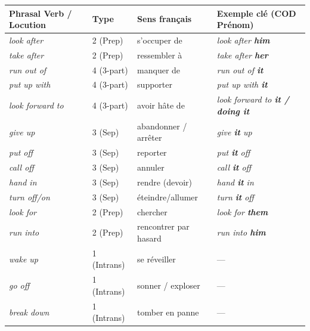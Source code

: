 \documentclass[11pt]{article}
\newcommand{\eng}[1]{\ifmmode\text{\textit{#1}}\else\begingroup\selectlanguage{english}\itshape #1\endgroup\fi}
\begin{document}
\begin{center}
\begin{tabularx}{\linewidth}{|X|X|X|X|}
\hline
\rowcolor{popblueL} \textbf{Phrasal Verb / Locution} & \textbf{Type} & \textbf{Sens français} & \textbf{Exemple clé (COD Prénom)} \\
\hline
\eng{look after} & 2 (Prep) & s'occuper de & \eng{look after \textbf{him}} \\
\eng{take after} & 2 (Prep) & ressembler à & \eng{take after \textbf{her}} \\
\eng{run out of} & 4 (3-part) & manquer de & \eng{run out of \textbf{it}} \\
\eng{put up with} & 4 (3-part) & supporter & \eng{put up with \textbf{it}} \\
\eng{look forward to} & 4 (3-part) & avoir hâte de & \eng{look forward to \textbf{it / doing it}} \\
\eng{give up} & 3 (Sep) & abandonner / arrêter & \eng{give \textbf{it} up} \\
\eng{put off} & 3 (Sep) & reporter & \eng{put \textbf{it} off} \\
\eng{call off} & 3 (Sep) & annuler & \eng{call \textbf{it} off} \\
\eng{hand in} & 3 (Sep) & rendre (devoir) & \eng{hand \textbf{it} in} \\
\eng{turn off/on} & 3 (Sep) & éteindre/allumer & \eng{turn \textbf{it} off} \\
\eng{look for} & 2 (Prep) & chercher & \eng{look for \textbf{them}} \\
\eng{run into} & 2 (Prep) & rencontrer par hasard & \eng{run into \textbf{him}} \\
\eng{wake up} & 1 (Intrans) & se réveiller & — \\
\eng{go off} & 1 (Intrans) & sonner / exploser & — \\
\eng{break down} & 1 (Intrans) & tomber en panne & — \\
\hline
\end{tabularx}
\end{center}
\end{document}
